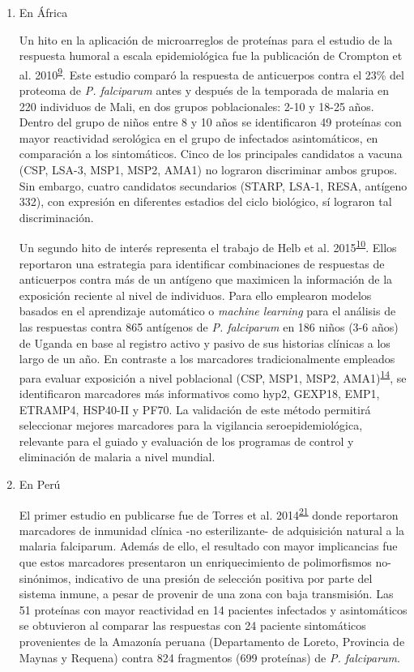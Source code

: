 \documentclass[]{article}
\begin{document}
\begin{enumerate}
\def\labelenumi{\alph{enumi}.}
\item
  En África

  Un hito en la aplicación de microarreglos de proteínas para el estudio
  de la respuesta humoral a escala epidemiológica fue la publicación de
  Crompton et al.
  2010\textsuperscript{\protect\hyperlink{ref-crompton2010}{9}}. Este
  estudio comparó la respuesta de anticuerpos contra el 23\% del
  proteoma de \emph{P. falciparum} antes y después de la temporada de
  malaria en 220 individuos de Mali, en dos grupos poblacionales: 2-10 y
  18-25 años. Dentro del grupo de niños entre 8 y 10 años se
  identificaron 49 proteínas con mayor reactividad serológica en el
  grupo de infectados asintomáticos, en comparación a los sintomáticos.
  Cinco de los principales candidatos a vacuna (CSP, LSA-3, MSP1, MSP2,
  AMA1) no lograron discriminar ambos grupos. Sin embargo, cuatro
  candidatos secundarios (STARP, LSA-1, RESA, antígeno 332), con
  expresión en diferentes estadios del ciclo biológico, sí lograron tal
  discriminación.

  Un segundo hito de interés representa el trabajo de Helb et al.
  2015\textsuperscript{\protect\hyperlink{ref-Helb2015exposure}{10}}.
  Ellos reportaron una estrategia para identificar combinaciones de
  respuestas de anticuerpos contra más de un antígeno que maximicen la
  información de la exposición reciente al nivel de individuos. Para
  ello emplearon modelos basados en el aprendizaje automático o
  \emph{machine learning} para el análisis de las respuestas contra 865
  antígenos de \emph{P. falciparum} en 186 niños (3-6 años) de Uganda en
  base al registro activo y pasivo de sus historias clínicas a los largo
  de un año. En contraste a los marcadores tradicionalmente empleados
  para evaluar exposición a nivel poblacional (CSP, MSP1, MSP2,
  AMA1)\textsuperscript{\protect\hyperlink{ref-elliott2014}{14}}, se
  identificaron marcadores más informativos como hyp2, GEXP18, EMP1,
  ETRAMP4, HSP40-II y PF70. La validación de este método permitirá
  seleccionar mejores marcadores para la vigilancia seroepidemiológica,
  relevante para el guiado y evaluación de los programas de control y
  eliminación de malaria a nivel mundial.
\item
  En Perú

  El primer estudio en publicarse fue de Torres et al.
  2014\textsuperscript{\protect\hyperlink{ref-Torres2014asymptomatic}{21}}
  donde reportaron marcadores de inmunidad clínica -no esterilizante- de
  adquisición natural a la malaria falciparum. Además de ello, el
  resultado con mayor implicancias fue que estos marcadores presentaron
  un enriquecimiento de polimorfismos no-sinónimos, indicativo de una
  presión de selección positiva por parte del sistema inmune, a pesar de
  provenir de una zona con baja transmisión. Las 51 proteínas con mayor
  reactividad en 14 pacientes infectados y asintomáticos se obtuvieron
  al comparar las respuestas con 24 paciente sintomáticos provenientes
  de la Amazonía peruana (Departamento de Loreto, Provincia de Maynas y
  Requena) contra 824 fragmentos (699 proteínas) de \emph{P.
  falciparum}.


\end{enumerate}
\end{document}
